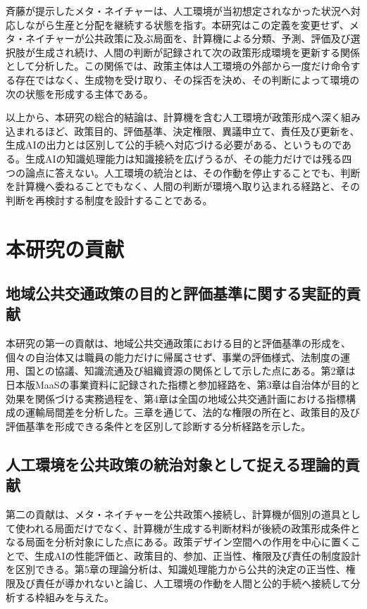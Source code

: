 斉藤が提示したメタ・ネイチャーは、人工環境が当初想定されなかった状況へ対応しながら生産と分配を継続する状態を指す\cite{saito2025metanature}。本研究はこの定義を変更せず、メタ・ネイチャーが公共政策に及ぶ局面を、計算機による分類、予測、評価及び選択肢が生成され続け、人間の判断が記録されて次の政策形成環境を更新する関係として分析した。この関係では、政策主体は人工環境の外部から一度だけ命令する存在ではなく、生成物を受け取り、その採否を決め、その判断によって環境の次の状態を形成する主体である。

以上から、本研究の総合的結論は、計算機を含む人工環境が政策形成へ深く組み込まれるほど、政策目的、評価基準、決定権限、異議申立て、責任及び更新を、生成AIの出力とは区別して公的手続へ対応づける必要がある、というものである。生成AIの知識処理能力は知識接続を広げうるが、その能力だけでは残る四つの論点に答えない。人工環境の統治とは、その作動を停止することでも、判断を計算機へ委ねることでもなく、人間の判断が環境へ取り込まれる経路と、その判断を再検討する制度を設計することである。

\section{本研究の貢献}
\label{sec:ch10_contributions}

\subsection{地域公共交通政策の目的と評価基準に関する実証的貢献}

本研究の第一の貢献は、地域公共交通政策における目的と評価基準の形成を、個々の自治体又は職員の能力だけに帰属させず、事業の評価様式、法制度の運用、国との協議、知識流通及び組織資源の関係として示した点にある。第2章は日本版MaaSの事業資料に記録された指標と参加経路を、第3章は自治体が目的と効果を関係づける実務過程を、第4章は全国の地域公共交通計画における指標構成の運輸局間差を分析した。三章を通じて、法的な権限の所在と、政策目的及び評価基準を形成できる条件とを区別して診断する分析経路を示した。

\subsection{人工環境を公共政策の統治対象として捉える理論的貢献}

第二の貢献は、メタ・ネイチャーを公共政策へ接続し、計算機が個別の道具として使われる局面だけでなく、計算機が生成する判断材料が後続の政策形成条件となる局面を分析対象にした点にある。政策デザイン空間への作用を中心に置くことで、生成AIの性能評価と、政策目的、参加、正当性、権限及び責任の制度設計を区別できる。第5章の理論分析は、知識処理能力から公共的決定の正当性、権限及び責任が導かれないと論じ、人工環境の作動を人間と公的手続へ接続して分析する枠組みを与えた。

